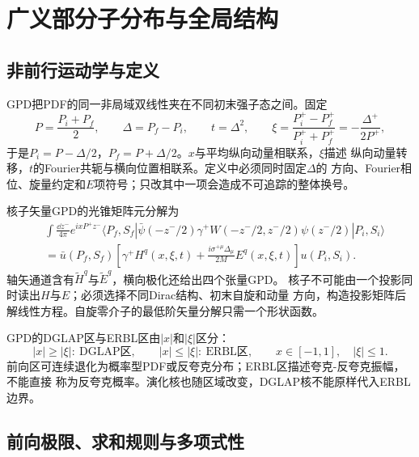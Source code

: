 \chapter{广义部分子分布与全局结构}

\section{非前行运动学与定义}

GPD把PDF的同一非局域双线性夹在不同初末强子态之间。固定
\begin{equation}
  P=\frac{P_i+P_f}{2},\qquad
  \Delta=P_f-P_i,\qquad
  t=\Delta^2,\qquad
  \xi=\frac{P_i^+-P_f^+}{P_i^++P_f^+}
  =-\frac{\Delta^+}{2P^+},
  \label{eq:b04-gpd-kinematics}
\end{equation}
于是$P_i=P-\Delta/2$，$P_f=P+\Delta/2$。$x$与平均纵向动量相联系，$\xi$描述
纵向动量转移，$t$的Fourier共轭与横向位置相联系。定义中必须同时固定$\Delta$的
方向、Fourier相位、旋量约定和$E$项符号；只改其中一项会造成不可追踪的整体换号。

核子矢量GPD的光锥矩阵元分解为
\begin{equation}
  \begin{aligned}
  &\int\frac{\dd z^-}{4\pi}e^{ixP^+z^-}
  \langle P_f,S_f|
  \bar\psi(-z^-/2)\gamma^+
  W(-z^-/2,z^-/2)\psi(z^-/2)
  |P_i,S_i\rangle\\
  &=\bar u(P_f,S_f)\left[
  \gamma^+H^q(x,\xi,t)
  +\frac{i\sigma^{+\mu}\Delta_\mu}{2M}E^q(x,\xi,t)
  \right]u(P_i,S_i).
  \end{aligned}
  \label{eq:b04-vector-gpd}
\end{equation}
轴矢通道含有$\widetilde H^q$与$\widetilde E^q$，横向极化还给出四个张量GPD。
核子不可能由一个投影同时读出$H$与$E$；必须选择不同Dirac结构、初末自旋和动量
方向，构造投影矩阵后解线性方程。自旋零介子的最低阶矢量分解只需一个形状函数。

GPD的DGLAP区与ERBL区由$|x|$和$|\xi|$区分：
\begin{equation}
  |x|\geq|\xi|:\ \text{DGLAP区},\qquad
  |x|\leq|\xi|:\ \text{ERBL区},\qquad
  x\in[-1,1],\quad |\xi|\leq1.
  \label{eq:b04-gpd-regions}
\end{equation}
前向区可连续退化为概率型PDF或反夸克分布；ERBL区描述夸克-反夸克振幅，不能直接
称为反夸克概率。演化核也随区域改变，DGLAP核不能原样代入ERBL边界。

\section{前向极限、求和规则与多项式性}

